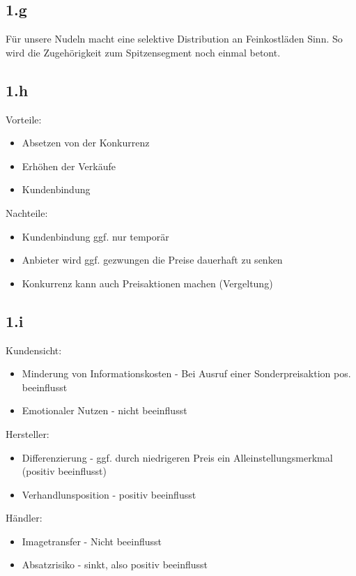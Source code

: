 \subsection*{1.g}
    Für unsere Nudeln macht eine selektive Distribution an Feinkostläden Sinn. So wird die Zugehörigkeit zum Spitzensegment noch einmal betont.

\subsection*{1.h}
    Vorteile:
    \begin{itemize}
        \item Absetzen von der Konkurrenz
        \item Erhöhen der Verkäufe
        \item Kundenbindung
    \end{itemize}

    Nachteile:
    \begin{itemize}
        \item Kundenbindung ggf. nur temporär
        \item Anbieter wird ggf. gezwungen die Preise dauerhaft zu senken
        \item Konkurrenz kann auch Preisaktionen machen (Vergeltung)
    \end{itemize}

\subsection*{1.i}
    Kundensicht:
    \begin{itemize}
        \item Minderung von Informationskosten - Bei Ausruf einer Sonderpreisaktion pos. beeinflusst
        \item Emotionaler Nutzen - nicht beeinflusst
    \end{itemize}

    Hersteller:
    \begin{itemize}
        \item Differenzierung - ggf. durch niedrigeren Preis ein Alleinstellungsmerkmal (positiv beeinflusst)
        \item Verhandlunsposition - positiv beeinflusst
    \end{itemize}

    Händler:
    \begin{itemize}
        \item Imagetransfer - Nicht beeinflusst
        \item Absatzrisiko - sinkt, also positiv beeinflusst
    \end{itemize}


